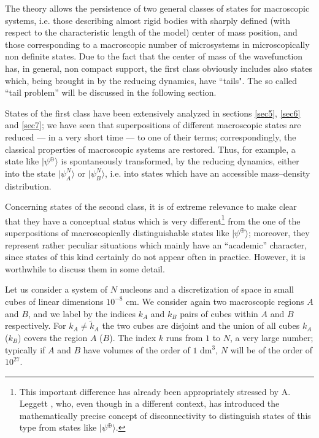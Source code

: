 \documentclass[10pt,a4paper]{article}
\begin{document}
The theory allows the persistence of two general classes of states
for macroscopic systems, i.e. those describing almost rigid bodies
with sharply defined (with respect to the characteristic  length
of the model) center of mass position, and those corresponding to
a macroscopic number of microsystems in microscopically non
definite states. Due to the fact that the center of mass of the
wavefunction has, in general, non compact support, the first class
obviously includes also states which, being brought in by the
reducing dynamics, have ``tails". The so called ``tail problem''
will be  discussed in the following section.

States of the first class have been extensively analyzed in
sections \ref{sec5}, \ref{sec6} and \ref{sec7};  we have seen
that superpositions of different macroscopic states are reduced
--- in a very short time --- to one of their terms;
correspondingly, the classical properties of
macroscopic systems are restored. Thus, for example, a state like
$|\psi^{\oplus}\rangle$ is spontaneously transformed, by the
reducing dynamics, either into the state $|\psi^{N}_{A}\rangle$ or
$|\psi^{N}_{B}\rangle$, i.e. into states which have an accessible
mass--density distribution.

Concerning states of the second class, it is of extreme relevance
to make  clear that they have a conceptual status which is very
different\footnote{This important difference has already been
appropriately stressed by A. Leggett \cite{legg80}, who, even
though in a different context, has introduced the mathematically
precise concept of disconnectivity to distinguish states of this
type from states like $|\psi^{\oplus}\rangle$.} from the one of
the superpositions of macroscopically distinguishable states like
$|\psi^{\oplus}\rangle$; moreover, they represent rather peculiar
situations which mainly have an ``academic'' character, since
states of this kind certainly do not appear often in practice.
However, it is worthwhile to discuss them in some detail.

Let us consider a system of $N$ nucleons and a discretization of
space in small cubes of linear dimensions $10^{-8}$ cm. We
consider again two macroscopic regions $A$ and $B$, and we label by the
indices $k_{A}$  and $k_{B}$  pairs of cubes within $A$ and $B$
respectively. For $k_{A} \neq \tilde k_{A}$  the two cubes are
disjoint and the union of all cubes $k_{A}$  ($k_{B}$) covers the
region $A$ ($B$). The index $k$ runs from $1$ to $N$, a very large
number; typically if $A$ and $B$ have volumes of the order of $1$
dm$^{3}$, $N$ will be of the order of $10^{27}$.
\end{document}
